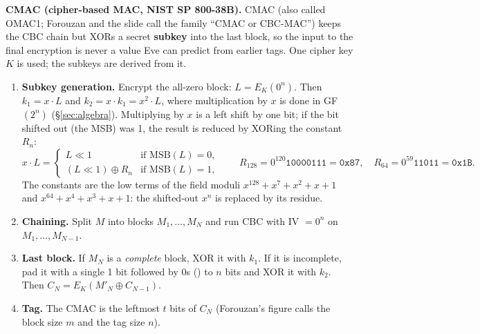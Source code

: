 \textbf{CMAC (cipher-based MAC, NIST SP 800-38B).} CMAC (also called OMAC1; Forouzan and the slide call the family ``CMAC or CBC-MAC'') keeps the CBC chain but XORs a secret \textbf{subkey} into the last block, so the input to the final encryption is never a value Eve can predict from earlier tags. One cipher key $K$ is used; the subkeys are derived from it.
\begin{enumerate}[leftmargin=1.6em]
  \item \textbf{Subkey generation.} Encrypt the all-zero block: $L = E_K(0^n)$. Then $k_1 = x \cdot L$ and $k_2 = x \cdot k_1 = x^2 \cdot L$, where multiplication by $x$ is done in GF$(2^n)$ (\S\ref{sec:algebra}). Multiplying by $x$ is a left shift by one bit; if the bit shifted out (the MSB) was 1, the result is reduced by XORing the constant $R_n$:
  \[
  x \cdot L = \begin{cases} L \ll 1 & \text{if } \mathrm{MSB}(L) = 0,\\ (L \ll 1) \oplus R_n & \text{if } \mathrm{MSB}(L) = 1,\end{cases} \qquad R_{128} = 0^{120}\texttt{10000111} = \texttt{0x87},\quad R_{64} = 0^{59}\texttt{11011} = \texttt{0x1B}.
  \]
  The constants are the low terms of the field moduli $x^{128} + x^7 + x^2 + x + 1$ and $x^{64} + x^4 + x^3 + x + 1$: the shifted-out $x^n$ is replaced by its residue.
  \item \textbf{Chaining.} Split $M$ into blocks $M_1, \dots, M_N$ and run CBC with IV $= 0^n$ on $M_1, \dots, M_{N-1}$.
  \item \textbf{Last block.} If $M_N$ is a \emph{complete} block, XOR it with $k_1$. If it is incomplete, pad it with a single 1 bit followed by 0s () to $n$ bits and XOR it with $k_2$. Then $C_N = E_K(M'_N \oplus C_{N-1})$.
  \item \textbf{Tag.} The CMAC is the leftmost $t$ bits of $C_N$ (Forouzan's figure calls the block size $m$ and the tag size $n$).
\end{enumerate}

